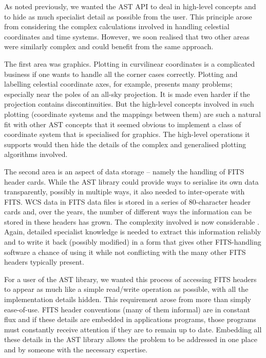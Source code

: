 \documentclass[final,authoryear,5p,times,twocolumn]{elsarticle}
\begin{document}
As noted previously, we wanted the AST API to deal in high-level
concepts and to hide as much specialist detail as possible from the
user. This principle arose from considering the complex calculations
involved in handling celestial coordinates and time systems. However,
we soon realised that two other areas were similarly complex and could
benefit from the same approach.

The first area was graphics. Plotting in curvilinear coordinates is a
complicated business if one wants to handle all the corner cases
correctly. Plotting and labelling celestial coordinate axes, for
example, presents many problems; especially near the poles of an all-sky
projection. It is made even harder if the projection contains
discontinuities. But the high-level concepts involved in such plotting
(coordinate systems and the mappings between them) are such a natural
fit with other AST concepts that it seemed obvious to implement a class
of coordinate system that is specialised for graphics. The high-level
operations it supports would then hide the details of the complex and
generalised plotting algorithms involved.

The second area is an aspect of data storage -- namely the handling of
FITS header cards. While the AST library could provide ways to
serialise its own data transparently, possibly in multiple ways, it
also needed to inter-operate with FITS. WCS data in FITS data files is
stored in a series of 80-character header cards and, over the years,
the number of different ways the information can be stored in these
headers has grown. The complexity involved is now considerable
\citep[see \emph{e.g.},][]{2015Thomas}. Again, detailed specialist knowledge
is needed to extract this information reliably and to write it back
(possibly modified) in a form that gives other FITS-handling software
a chance of using it while not conflicting with the many other FITS
headers typically present.

For a user of the AST library, we wanted this process of accessing FITS
headers to appear as much like a simple read/write operation as
possible, with all the implementation details hidden. This requirement
arose from more than simply ease-of-use. FITS header conventions (many
of them informal) are in constant flux and if these details are embedded
in applications programs, those programs must constantly receive
attention if they are to remain up to date. Embedding all these details
in the AST library allows the problem to be addressed in one place and
by someone with the necessary expertise.
\end{document}
